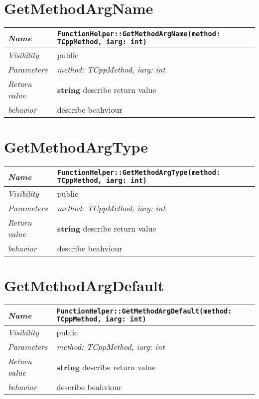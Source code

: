 \section{GetMethodArgName}
\begin{longtable}{p{3cm} @{\hskip 1cm} p{12cm}}
 \hline
\textit{Name} & \texttt{FunctionHelper::GetMethodArgName(method: TCppMethod, iarg: int)}\\
\hline
 \textit{Visibility} & public\\
\hline
\textit{Parameters} & \textit{method: TCppMethod, iarg: int}\\
\hline
\textit{Return value} & \textbf{ string} describe return value\\
  \hline
 \textit{behavior} & describe beahviour \\
\hline
\end{longtable} \pagebreak
 \section{GetMethodArgType}
\begin{longtable}{p{3cm} @{\hskip 1cm} p{12cm}}
 \hline
\textit{Name} & \texttt{FunctionHelper::GetMethodArgType(method: TCppMethod, iarg: int)}\\
\hline
 \textit{Visibility} & public\\
\hline
\textit{Parameters} & \textit{method: TCppMethod, iarg: int}\\
\hline
\textit{Return value} & \textbf{ string} describe return value\\
  \hline
 \textit{behavior} & describe beahviour \\
\hline
\end{longtable} \pagebreak
 \section{GetMethodArgDefault}
\begin{longtable}{p{3cm} @{\hskip 1cm} p{12cm}}
 \hline
\textit{Name} & \texttt{FunctionHelper::GetMethodArgDefault(method: TCppMethod, iarg: int)}\\
\hline
 \textit{Visibility} & public\\
\hline
\textit{Parameters} & \textit{method: TCppMethod, iarg: int}\\
\hline
\textit{Return value} & \textbf{ string} describe return value\\
  \hline
 \textit{behavior} & describe beahviour \\
\hline
\end{longtable} \pagebreak
